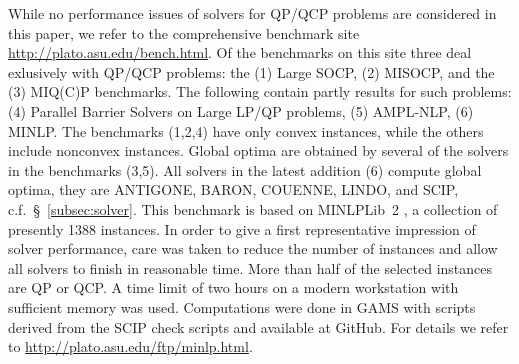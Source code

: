 While no performance issues of solvers for QP/QCP problems are considered in 
this paper, we refer to the comprehensive benchmark site \url{http://plato.asu.edu/bench.html}. Of the benchmarks
on this site three deal exlusively with QP/QCP problems: 
the (1) Large SOCP, (2) MISOCP, and the (3) MIQ(C)P benchmarks. 
The following contain partly results for such problems: 
(4) Parallel Barrier Solvers on Large LP/QP problems, (5) AMPL-NLP, (6) MINLP.
The benchmarks (1,2,4) have only convex instances, while the others include 
nonconvex instances. Global optima are obtained by several of the solvers in
the benchmarks (3,5).
All solvers in the latest addition (6) compute global optima, they are ANTIGONE,
BARON, COUENNE, LINDO, and SCIP, c.f.~\S~\ref{subsec:solver}. This benchmark is based on MINLPLib~2 \cite{Vigerske2014}, a
collection of presently 1388 instances. In order to give a first representative
impression of solver performance, care was taken to reduce the number of instances and 
allow all solvers to finish in reasonable time. More than half of the selected
instances are QP or QCP. A time limit of two hours on a
modern workstation with sufficient memory was used. Computations were done in
GAMS with scripts derived from the SCIP check scripts and available at GitHub.
For details we refer to \url{http://plato.asu.edu/ftp/minlp.html}.

